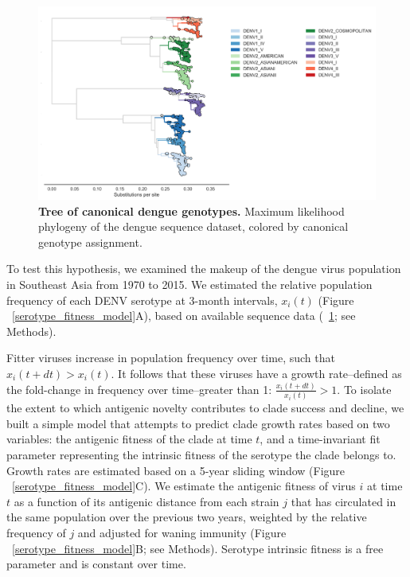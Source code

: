 \documentclass[11pt,oneside,letterpaper]{article}
\begin{document}
\begin{figure}[h]
  \begin{centering}
    \includegraphics[width=\linewidth]{../figures/png/genotype_tree.png}
  	\caption{\textbf{Tree of canonical dengue genotypes.} \linebreak Maximum likelihood phylogeny of the dengue sequence dataset, colored by canonical genotype assignment.}
  	\label{genotype_tree}
  \end{centering}
\end{figure}

To test this hypothesis, we examined the makeup of the dengue virus population in Southeast Asia from 1970 to 2015.
We estimated the relative population frequency of each DENV serotype at 3-month intervals, $x_i(t)$ (Figure ~\ref{serotype_fitness_model}A), based on available sequence data (~\ref{genotype_tree}; see Methods).

Fitter viruses increase in population frequency over time, such that $x_i(t+dt) > x_i(t)$.
It follows that these viruses have a growth rate--defined as the fold-change in frequency over time--greater than 1: $\frac{x_i(t+dt)}{x_i(t)} > 1$.
To isolate the extent to which antigenic novelty contributes to clade success and decline, we built a simple model that attempts to predict clade growth rates based on two variables: the antigenic fitness of the clade at time $t$, and a time-invariant fit parameter representing the intrinsic fitness of the serotype the clade belongs to.
Growth rates are estimated based on a 5-year sliding window (Figure ~\ref{serotype_fitness_model}C).
We estimate the antigenic fitness of virus $i$ at time $t$ as a function of its antigenic distance from each strain $j$ that has circulated in the same population over the previous two years, weighted by the relative frequency of $j$ and adjusted for waning immunity (Figure ~\ref{serotype_fitness_model}B; see Methods).
Serotype intrinsic fitness is a free parameter and is constant over time.
\end{document}
